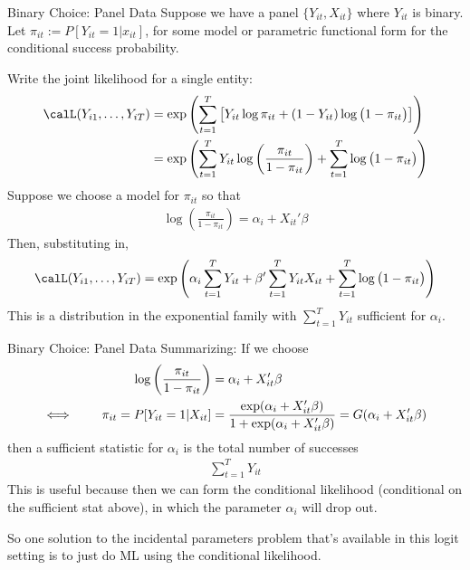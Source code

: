 \documentclass[aspectratio=169, handout]{beamer}
\newcommand{\sumtT}{\sum^T_{t=1}}
\begin{document}
{\footnotesize
\begin{frame}{Binary Choice: Panel Data}
Suppose we have a panel $\{Y_{it},X_{it}\}$ where $Y_{it}$ is binary.
Let $\pi_{it} := P[Y_{it}=1|x_{it}]$, for some model or parametric
functional form for the conditional success probability.

Write the joint likelihood for a single entity:
\begin{align*}
  \calL(Y_{i1},\ldots,Y_{iT})
  &=
  \exp\left(
  \sumtT
  \big[
  Y_{it}\log \pi_{it}
  +
  (1-Y_{it})\log\big(1-\pi_{it}\big)
  \big]
  \right)
  \\
  &=
  \exp\left(
  \sumtT
  Y_{it}
  \log\left(\frac{\pi_{it}}{1-\pi_{it}}\right)
  +
  \sumtT
  \log\big(1-\pi_{it}\big)
  \right)
\end{align*}
Suppose we choose a model for $\pi_{it}$ so that
\begin{align*}
  \log\left(\frac{\pi_{it}}{1-\pi_{it}}\right)
  =
  \alpha_i + X_{it}'\beta
\end{align*}
Then, substituting in,
\begin{align*}
  \calL(Y_{i1},\ldots,Y_{iT})
  =
  \exp\left(
  \alpha_i
  \sumtT
  Y_{it}
  +
  \beta'
  \sumtT
  Y_{it} X_{it}
  +
  \sumtT
  \log\big(1-\pi_{it}\big)
  \right)
\end{align*}
This is a distribution in the exponential family with
$\sumtT Y_{it}$ sufficient for $\alpha_i$.
\end{frame}
}


\begin{frame}{Binary Choice: Panel Data}
Summarizing:
If we choose
\begin{align*}
  \log\left(\frac{\pi_{it}}{1-\pi_{it}}\right)
  &=
  \alpha_i + X_{it}'\beta
  \\
  \iff\qquad
  \pi_{it}
  =
  P[Y_{it}=1|X_{it}]
  &=
  \frac{%
    \exp(\alpha_i+X_{it}'\beta)
  }{%
    1+\exp(\alpha_i+X_{it}'\beta)
  }
  =
  G(\alpha_i+X_{it}'\beta)
\end{align*}
then a sufficient statistic for $\alpha_i$ is
the total number of successes
\begin{align*}
  \sumtT
  Y_{it}
\end{align*}
This is useful because then we can form the conditional likelihood
(conditional on the sufficient stat above), in which the parameter
$\alpha_i$ will drop out.

So one solution to the incidental parameters problem that's available in
this logit setting is to just do ML using the conditional likelihood.
\end{frame}
\end{document}
